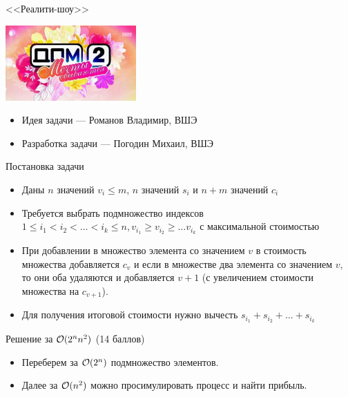 \begin{frame}
  \begin{center}
    \LARGE <<Реалити-шоу>>
  \end{center}

  \begin{center}
      \includegraphics[width=5cm]{memes/g-meme.jpg}
  \end{center}

  \begin{itemize}
  \item Идея задачи --- Романов Владимир, ВШЭ
  \item Разработка задачи --- Погодин Михаил, ВШЭ
  \end{itemize}

\end{frame}

\begin{frame}{Постановка задачи}
  \begin{itemize}
    \vspace{-1em}
  \item Даны $n$ значений $v_i \leq m$, $n$ значений $s_i$ и $n + m$ значений $c_i$
  \item Требуется выбрать подмножество индексов $1 \leq i_1 < i_2 < \ldots < i_k \leq n, v_{i_1} \geq v_{i_2} \geq \ldots v_{i_k}$ с максимальной стоимостью
  \item При добавлении в множество элемента со значением $v$ в стоимость множества добавляется $c_v$ и если в множестве два элемента со значением $v$, то они оба удаляются и добавляется $v + 1$ (с увеличением стоимости множества на $c_{v+1}$).
  \item Для получения итоговой стоимости нужно вычесть $s_{i_1} + s_{i_2} + \ldots + s_{i_k}$
  \end{itemize}
\end{frame}

\begin{frame}{Решение за $\mathcal{O}(2^n n^2)$ (14 баллов)}
  \begin{itemize}
  \item Переберем за $\mathcal{O}(2^n)$ подмножество элементов.
  \item Далее за $\mathcal{O}(n^2)$ можно просимулировать процесс и найти прибыль.
  \end{itemize}
\end{frame}

